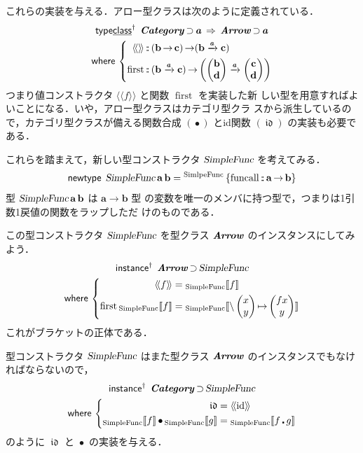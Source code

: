 \documentclass[a5paper,twoside,fleqn,draft]{jsbook}
\newcommand{\TK}[1]{\mask{\textbf{TK:}~#1}{C}}
\def\[{[\![}
\def\]{]\!]}
\def\llangle{\langle\!\langle}
\def\rrangle{\rangle\!\rangle}
\newcommand{\Langle}{\llangle}
\newcommand{\Rangle}{\rrangle}
\newcommand{\mKeyword}[1]{\mathsf{#1}}
\newcommand{\mKeywordUnderline}[1]{\text{\underline{\textsf{#1}}}}
\newcommand{\mInstanceDeclKeyword}{\mKeyword{instance}}
\newcommand{\mNewTypeDeclKeyword}{\mKeyword{newtype}}
\newcommand{\mTypeClassDeclKeyword}{\mKeyword{type}\mKeywordUnderline{class}}
\newcommand{\mWhereKeyword}{\mKeyword{where}}
\newcommand{\mPolymorphic}[1]{{#1}^\dagger}
\DeclareMathOperator{\mInstanceDeclPolymorphic}{\mPolymorphic{\mInstanceDeclKeyword}}
\DeclareMathOperator{\mNewTypeDecl}{\mNewTypeDeclKeyword}
\DeclareMathOperator{\mSuperClass}{\;\Rightarrow\;}
\DeclareMathOperator{\mSuperSet}{\supset}
\DeclareMathOperator{\mTypeClassDeclPolymorphic}{\mPolymorphic{\mTypeClassDeclKeyword}}
\DeclareMathOperator{\mWhere}{\mWhereKeyword}
\newcommand{\mSpecialFunc}[1]{\mathrm{#1}}
\newcommand{\mVarSpecialFunc}[1]{\mathfrak{#1}}
\DeclareMathOperator{\mFirst}{\mSpecialFunc{first}}
\DeclareMathOperator{\mFuncall}{\mSpecialFunc{funcall}}
\DeclareMathOperator{\mId}{\mSpecialFunc{id}}
\DeclareMathOperator{\mIdCat}{\mVarSpecialFunc{id}}
\newcommand{\mArrowArrow}[1]{\xrightarrow{#1}}
\DeclareMathOperator{\mCompFunc}{\centerdot}
\DeclareMathOperator{\mCompCat}{\bullet}
\DeclareMathOperator{\mFuncArrow}{\rightarrow}
\DeclareMathOperator{\mIn}{{:\!:}}
\DeclareMathOperator{\mLambda}{\backslash}
\DeclareMathOperator{\mLambdaArrow}{\mapsto}
\newcommand{\mType}[1]{\mathbf{#1}} %
\newcommand{\mPolymorphicTypeParameter}[1]{\textbf{\textit{#1}}}
\newcommand{\mA}{\mType{a}}
\newcommand{\mB}{\mType{b}}
\newcommand{\mC}{\mType{c}}
\newcommand{\mD}{\mType{d}}
\newcommand{\mTypeConstructor}[1]{\textsl{#1}}
\newcommand{\mValueConstructor}[1]{\mathrm{#1}}
\newcommand{\mValueWith}[2]{{}_\mValueConstructor{#1}\[#2\]}
\newcommand{\mValueRecordBeginWith}[1]{{}^\mValueConstructor{#1}\,\{}
\newcommand{\mValueRecordEnd}{\}}
\newcommand{\mValueRecordWith}[2]{\mValueRecordBeginWith{#1}{#2}\mValueRecordEnd}
\newcommand{\mArrowWith}[1]{\Langle#1\Rangle}
\newcommand{\mPairWith}[2]{\begin{pmatrix}#1\\#2\end{pmatrix}}
\newcommand{\mTypeClass}[1]{\textbf{\textit{#1}}}
\newcommand{\mArrowTypeClass}{\mTypeClass{Arrow}}
\newcommand{\mCatTypeClass}{\mTypeClass{Category}}
\begin{document}
これらの実装を与える．アロー型クラスは次のように定義されている．
\begin{multline}
  \mTypeClassDeclPolymorphic\;
  \mCatTypeClass\mSuperSet\mPolymorphicTypeParameter{a}
  \mSuperClass
  \mArrowTypeClass\mSuperSet\mPolymorphicTypeParameter{a}\\
  \mWhere{}
  \left\{
  \begin{aligned}
    \mArrowWith{}
    &\mIn{}(\mB\mFuncArrow\mC)
    \mFuncArrow(\mB\mArrowArrow{\mPolymorphicTypeParameter{a}}\mC)\\
    \mFirst
    &\mIn{}(\mB\mArrowArrow{\mPolymorphicTypeParameter{a}}\mC)
    \mFuncArrow\left(\mPairWith{\mB}{\mD}
    \mArrowArrow{\mPolymorphicTypeParameter{a}}\mPairWith{\mC}{\mD}\right)
  \end{aligned}
  \right.
\end{multline}
つまり値コンストラクタ $\mArrowWith{f}$ と関数 $\mFirst$ を実装した新
しい型を用意すればよいことになる．いや，アロー型クラスはカテゴリ型クラ
スから派生しているので，カテゴリ型クラスが備える関数合成 $(\mCompCat)$
とid関数 $(\mIdCat)$ の実装も必要である．

これらを踏まえて，新しい型コンストラクタ
$\mTypeConstructor{SimpleFunc}$ を考えてみる．
\begin{equation}
  \mNewTypeDecl\;
  \mTypeConstructor{SimpleFunc}\,\mA\,\mB
  =\mValueRecordWith{SimlpeFunc}{\mFuncall\mIn\mA\mFuncArrow\mB}
\end{equation}
型 $\mTypeConstructor{SimpleFunc}\,\mA\,\mB$ は $\mA\mFuncArrow\mB$ 型
の変数を唯一のメンバに持つ型で，つまりは1引数1戻値の関数をラップしただ
けのものである．

この型コンストラクタ $\mTypeConstructor{SimpleFunc}$ を型クラス
$\mArrowTypeClass$ のインスタンスにしてみよう．
\begin{multline}
  \mInstanceDeclPolymorphic\;
  \mArrowTypeClass\mSuperSet\mTypeConstructor{SimpleFunc}\\
  \mWhere{}
  \left\{
  \begin{aligned}
    \mArrowWith{f}
    &=\mValueWith{SimpleFunc}{f}\\
    \mFirst\mValueWith{SimpleFunc}{f}
    &=\mValueWith{SimpleFunc}{\mLambda\mPairWith{x}{y}\mLambdaArrow\mPairWith{fx}{y}}
  \end{aligned}
  \right.
\end{multline}
これがブラケットの正体である．
\TK{...}

型コンストラクタ $\mTypeConstructor{SimpleFunc}$ はまた型クラス
$\mArrowTypeClass$ のインスタンスでもなければならないので，
\begin{multline}
  \mInstanceDeclPolymorphic\;
  \mCatTypeClass\mSuperSet\mTypeConstructor{SimpleFunc}\\
  \mWhere{}
  \left\{
  \begin{aligned}
    \mIdCat
    &=\mArrowWith{\mId}\\
    \mValueWith{SimpleFunc}{f}\mCompCat\mValueWith{SimpleFunc}{g}
    &=\mValueWith{SimpleFunc}{f\mCompFunc g}
  \end{aligned}
  \right.
\end{multline}
のように $\mIdCat$ と $\mCompCat$ の実装を与える．
\end{document}

